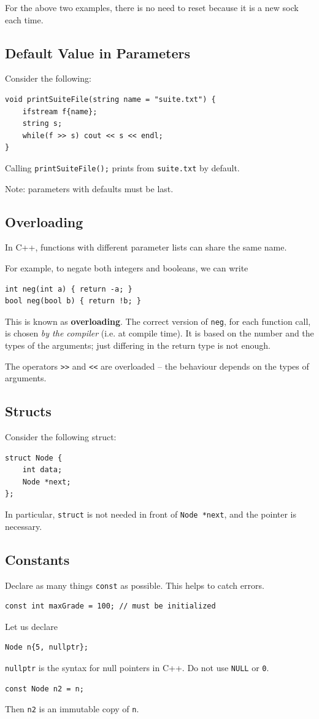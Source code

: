\documentclass[11pt]{article}
\theoremstyle{definition}
\begin{document}
For the above two examples, there is no need to reset because it is a new sock each time.

\subsection{Default Value in Parameters}
Consider the following:
\begin{lstlisting}
void printSuiteFile(string name = "suite.txt") {
    ifstream f{name};
    string s;
    while(f >> s) cout << s << endl;
}
\end{lstlisting}
Calling {\tt printSuiteFile();} prints from {\tt suite.txt} by default.

Note: parameters with defaults must be last.

\subsection{Overloading}
In C++, functions with different parameter lists can share the same name. 

For example, to negate both integers and booleans, we can write
\begin{lstlisting}
int neg(int a) { return -a; }
bool neg(bool b) { return !b; }
\end{lstlisting}
This is known as {\bf overloading}. The correct version of {\tt neg}, for each function call, is chosen {\it by the compiler} (i.e. at compile time). It is based on the number and the types of the arguments; just differing in the return type is not enough.

The operators {\tt >\null>} and {\tt <\null<} are overloaded -- the behaviour depends on the types of arguments.

\subsection{Structs}
Consider the following struct:
\begin{lstlisting}
struct Node {
    int data;
    Node *next;
};
\end{lstlisting}
In particular, {\tt struct} is not needed in front of {\tt Node *next}, and the pointer is necessary.

\subsection{Constants}
Declare as many things {\tt const} as possible. This helps to catch errors.
\begin{lstlisting}
const int maxGrade = 100; // must be initialized
\end{lstlisting}
Let us declare
\begin{lstlisting}
Node n{5, nullptr};
\end{lstlisting}
{\tt nullptr} is the syntax for null pointers in C++. Do not use {\tt NULL} or {\tt 0}.
\begin{lstlisting}
const Node n2 = n; 
\end{lstlisting}
Then {\tt n2} is an immutable copy of {\tt n}.
\newpage
\end{document}
